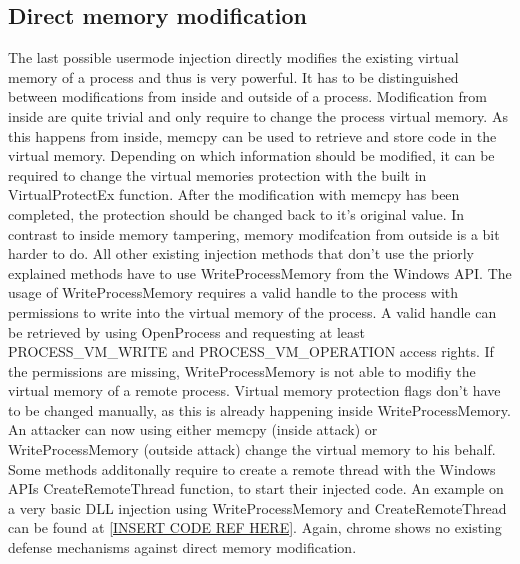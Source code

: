 \subsection{Direct memory modification}
The last possible usermode injection directly modifies the existing virtual memory of a process and thus is very powerful. It has to be distinguished between modifications from inside and outside of a process. Modification from inside are quite trivial and only require to change the process virtual memory. As this happens from inside, memcpy can be used to retrieve and store code in the virtual memory. Depending on which information should be modified, it can be required to change the virtual memories protection with the built in VirtualProtectEx function. After the modification with memcpy has been completed, the protection should be changed back to it's original value.
In contrast to inside memory tampering, memory modifcation from outside is a bit harder to do. All other existing injection methods that don't use the priorly explained methods have to use WriteProcessMemory from the Windows API. The usage of WriteProcessMemory requires a valid handle to the process with permissions to write into the virtual memory of the process. A valid handle can be retrieved by using OpenProcess and requesting at least PROCESS\_VM\_WRITE and PROCESS\_VM\_OPERATION access rights. If the permissions are missing, WriteProcessMemory is not able to modifiy the virtual memory of a remote process. Virtual memory protection flags don't have to be changed manually, as this is already happening inside WriteProcessMemory. An attacker can now using either memcpy (inside attack) or WriteProcessMemory (outside attack) change the virtual memory to his behalf. Some methods additonally require to create a remote thread with the Windows APIs CreateRemoteThread function, to start their injected code. An example on a very basic DLL injection using WriteProcessMemory and CreateRemoteThread can be found at \ref{INSERT CODE REF HERE}. Again, chrome shows no existing defense mechanisms against direct memory modification.